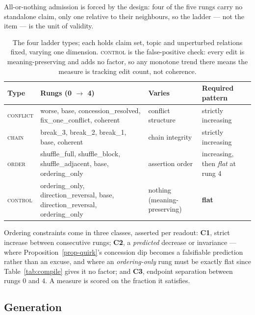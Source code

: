 \documentclass{article} %
\begin{document}
All-or-nothing admission is forced by the design: four of the five rungs carry no standalone claim,
only one relative to their neighbours, so the ladder --- not the item --- is the unit of validity.

\begin{table}[t]
\centering\small
\caption{The four ladder types; each holds claim set, topic and unperturbed relations fixed,
  varying one dimension. \textsc{control} is the false-positive check: every edit is
  meaning-preserving and adds no factor, so any monotone trend there means the measure is
  tracking edit count, not coherence.}
\label{tab:ladders}
\begin{tabular}{@{}lp{5.3cm}p{2.5cm}p{3.1cm}@{}}
\toprule
Type & Rungs (0 $\to$ 4) & Varies & Required pattern \\
\midrule
\textsc{conflict} & worse, base, concession\_resolved,
                    fix\_one\_conflict, coherent
                  & conflict structure & strictly increasing \\[2pt]
\textsc{chain}    & break\_3, break\_2, break\_1, base, coherent
                  & chain integrity & strictly increasing \\[2pt]
\textsc{order}    & shuffle\_full, shuffle\_block,
                    shuffle\_adjacent, base, ordering\_only
                  & assertion order & increasing, then \emph{flat} at rung 4 \\[2pt]
\textsc{control}  & ordering\_only, direction\_reversal, base,
                    direction\_reversal, ordering\_only
                  & nothing (meaning-preserving) & \textbf{flat} \\
\bottomrule
\end{tabular}
\end{table}

Ordering constraints come in three classes, asserted per readout: \textbf{C1}, strict increase
between consecutive rungs; \textbf{C2}, a \emph{predicted} decrease or invariance --- where
Proposition~\ref{prop-quirk}'s concession dip becomes a falsifiable prediction rather than an
excuse, and where an \emph{ordering-only} rung must be exactly flat since
Table~\ref{tab:compile} gives it no factor; and \textbf{C3}, endpoint separation between rungs
$0$ and $4$. A measure is scored on the fraction it satisfies.

\subsection{Generation}
\end{document}
